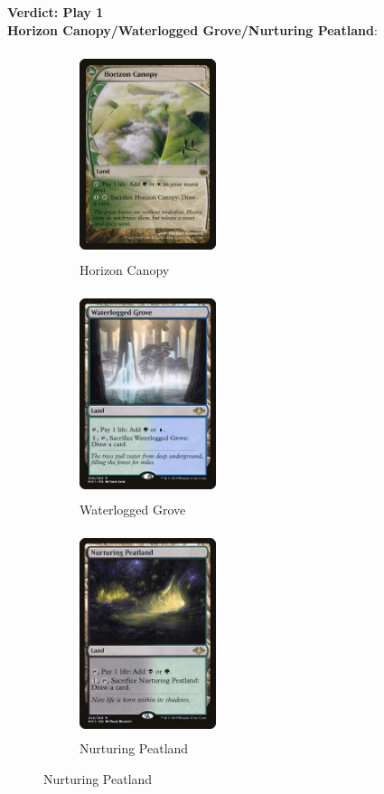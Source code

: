 \documentclass{report}
\begin{document}
\textbf{Verdict: Play 1}\\
\newpage
\textbf{Horizon Canopy/Waterlogged Grove/Nurturing Peatland}:\\
\begin{figure}
  \begin{subfigure}[b]{.325\textwidth}
\begin{center}
    \includegraphics [width = 4cm, height = 6cm] {horizon-canopy}
    \caption{Horizon Canopy}
    \label{fig:1}
\end{center}
  \end{subfigure}
  \begin{subfigure}[b]{.325\textwidth}
\begin{center}
    \includegraphics [width = 4cm, height = 6cm] {waterlogged-grove}
    \caption{Waterlogged Grove}
    \label{fig:2}
\end{center}
  \end{subfigure}
%
  \begin{subfigure}[b]{.325\textwidth}
\begin{center}
    \includegraphics [width = 4cm, height = 6cm] {nurturing-peatland}
    \caption{Nurturing Peatland}
    \label{fig:3}
\end{center}
  \end{subfigure}
\end{figure}
\end{document}
